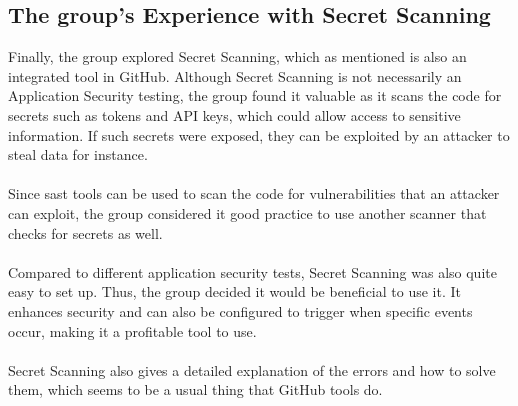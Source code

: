 \subsection{The group's Experience with Secret Scanning}
Finally, the group explored Secret Scanning, which as mentioned is also an integrated tool in GitHub. Although Secret Scanning is not necessarily an Application Security testing, the group found it valuable as it scans the code for secrets such as tokens and API keys, which could allow access to sensitive information. If such secrets were exposed, they can be exploited by an attacker to steal data for instance. 
\\~\\
Since \acrshort{sast} tools can be used to scan the code for vulnerabilities that an attacker can exploit, the group considered it good practice to use another scanner that checks for secrets as well. 
\\~\\
Compared to different application security tests, Secret Scanning was also quite easy to set up. Thus, the group decided it would be beneficial to use it. It enhances security and can also be configured to trigger when specific events occur, making it a profitable tool to use. 
\\~\\
Secret Scanning also gives a detailed explanation of the errors and how to solve them, which seems to be a usual thing that GitHub tools do. 

